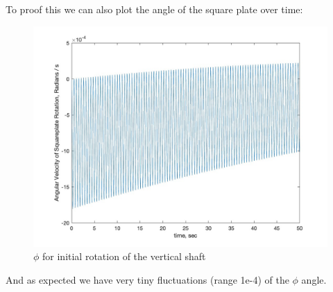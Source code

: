 To proof this we can also plot the angle of the square plate over time:
\clearpage %
\begin{figure}[ht]
    \centering
    \includegraphics[scale=0.35]{images/phi_case_2.jpg}
    \caption{$\phi$ for initial rotation of the vertical shaft}
    \label{fig:phi_case_2}
\end{figure}
And as expected we have very tiny fluctuations (range 1e-4) of the $\phi$ angle.